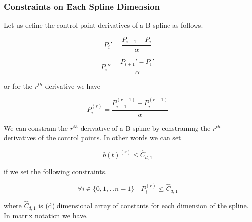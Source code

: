 \documentclass{article}
\begin{document}
\subsubsection{Constraints on Each Spline Dimension}

Let us define the control point derivatives of a B-spline as follows.

\begin{equation}
    P_i' = \frac{P_{i+1} - P_{i}}{\alpha}
\end{equation}

\begin{equation}
   P_i''= \frac{P_{i+1}' - P_{i}'}{\alpha}
\end{equation}

or for the \(r^{th}\) derivative we have

\begin{equation}
    P_i^{(r)} = \frac{P_{i+1}^{(r-1)} - P_{i}^{(r-1)}}{\alpha}
\end{equation}

We can constrain the \(r^{th}\) derivative of a B-spline by constraining the \(r^{th}\) derivatives of the control points. In other words we can set

\begin{equation}
    b(t)^{(r)} \leq \hat{C}_{d,1}
\end{equation}

if we set the following constraints.

\begin{equation}
    \forall i \in \{0 , 1 , ... n-1\} \quad
    P_i^{(r)} \leq \hat{C}_{d,1}
\end{equation}

where \(\hat{C}_{d,1}\) is (d) dimensional array of constants for each dimension of the spline. In matrix notation we have.
\end{document}
